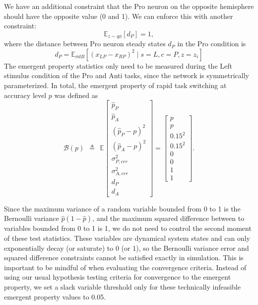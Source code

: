 \documentclass[11pt]{article}
\begin{document}
We have an additional constraint that the Pro neuron on the opposite hemisphere should have the opposite value (0 and 1).  We can enforce this with another constraint:
\begin{equation}
\mathbb{E}_{z \sim q\phi} \left[ d_P \right] = 1,
\end{equation}
where the distance between Pro neuron steady states $d_P$ in the Pro condition is
\begin{equation}
d_P =  \mathbb{E}_{\sigma dB} \left[ (x_{LP} - x_{RP})^2  \mid s=L, c=P, z=z_i \right]
\end{equation}
The emergent property statistics only need to be measured during the Left stimulus condition of the Pro and Anti tasks, since the network is symmetrically parameterized.
In total, the emergent property of rapid task switching at accuracy level $p$ was defined as
\begin{equation}
\mathcal{B}(p) ~~\triangleq~~ \mathbb{E}\begin{bmatrix} \hat{p}_P \\ \hat{p}_A \\ (\hat{p}_P-p)^2 \\ (\hat{p}_A - p)^2 \\ \sigma^2_{P,err} \\ \sigma^2_{A,err} \\ d_P \\ d_A \end{bmatrix} = \begin{bmatrix} p \\ p \\ 0.15^2 \\ 0.15^2 \\ 0 \\ 0 \\ 1 \\ 1 \end{bmatrix}.
\end{equation}

Since the maximum variance of a random variable bounded from 0 to 1 is the Bernoulli variance $\hat{p}(1-\hat{p})$, and the maximum squared difference between to variables bounded from 0 to 1 is 1, we do not need to control the second moment of these test statistics. 
These variables are dynamical system states and can only exponentially decay (or saturate) to 0 (or 1), so the Bernoulli variance error and squared difference constraints cannot be satisfied exactly in simulation.  
This is important to be mindful of when evaluating the convergence criteria.  
Instead of using our usual hypothesis testing criteria for convergence to the emergent property, we set a slack variable threshold only for these technically infeasible emergent property values to 0.05.
\end{document}
